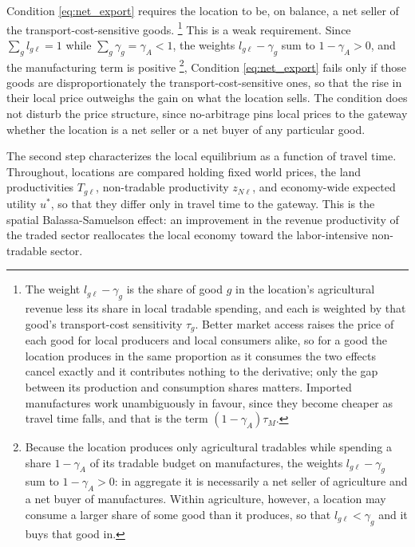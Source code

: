 \documentclass[11pt]{article}
\begin{document}
Condition \eqref{eq:net_export} requires the location to be, on balance, a net seller of the transport-cost-sensitive goods. \footnote{The weight $l_{g\ell}-\gamma_g$ is the share of good $g$ in the location's agricultural revenue less its share in local tradable spending, and each is weighted by that good's transport-cost sensitivity $\tau_g$. Better market access raises the price of each good for local producers and local consumers alike, so for a good the location produces in the same proportion as it consumes the two effects cancel exactly and it contributes nothing to the derivative; only the gap between its production and consumption shares matters. Imported manufactures work unambiguously in favour, since they become cheaper as travel time falls, and that is the term $(1-\gamma_A)\tau_M$.} This is a weak requirement. Since $\sum_g l_{g\ell}=1$ while $\sum_g \gamma_g=\gamma_A<1$, the weights $l_{g\ell}-\gamma_g$ sum to $1-\gamma_A>0$, and the manufacturing term is positive \footnote{Because the location produces only agricultural tradables while spending a share $1-\gamma_A$ of its tradable budget on manufactures, the weights $l_{g\ell}-\gamma_g$ sum to $1-\gamma_A>0$: in aggregate it is necessarily a net seller of agriculture and a net buyer of manufactures. Within agriculture, however, a location may consume a larger share of some good than it produces, so that $l_{g\ell}<\gamma_g$ and it buys that good in.}, Condition \eqref{eq:net_export} fails only if those goods are disproportionately the transport-cost-sensitive ones, so that the rise in their local price outweighs the gain on what the location sells. The condition does not disturb the price structure, since no-arbitrage pins local prices to the gateway whether the location is a net seller or a net buyer of any particular good.

The second step characterizes the local equilibrium as a function of travel time. Throughout, locations are compared holding fixed world prices, the land productivities $T_{g\ell}$, non-tradable productivity $z_{N\ell}$, and economy-wide expected utility $u^\ast$, so that they differ only in travel time to the gateway. This is the spatial Balassa-Samuelson effect: an improvement in the revenue productivity of the traded sector reallocates the local economy toward the labor-intensive non-tradable sector.
\end{document}
